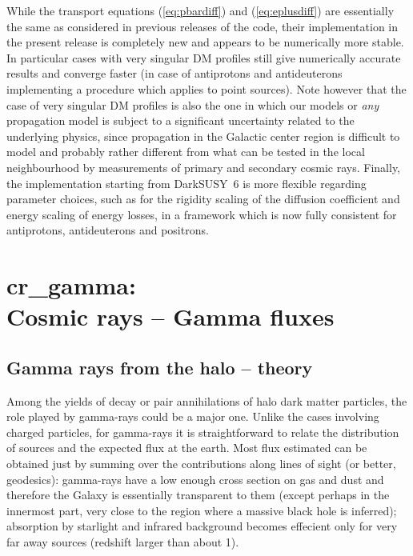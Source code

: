 \documentclass[a4paper,10pt,oneside]{book}
\newcommand{\codeb}[1]{\ftb{#1}}
\newcommand{\ds}{{\sffamily DarkSUSY}}
\newcommand{\ftb}[1]{{\bfseries \sffamily #1}}
\begin{document}
While the transport equations (\ref{eq:pbardiff}) and (\ref{eq:eplusdiff}) are essentially the same as considered
in previous releases of the code, their implementation in the present release is completely new and appears to be
numerically more stable. In particular cases with very singular DM profiles still give numerically accurate
results and converge faster
(in case of antiprotons and antideuterons implementing a procedure which applies to point sources).
Note however that the case of very singular DM profiles is also the one in which
 our models or 
{\it any} propagation model is subject to a significant uncertainty related to the underlying
physics,
since propagation in the
Galactic center region is difficult to model and probably rather different from what can be tested in the
local neighbourhood by measurements of primary and secondary cosmic rays. Finally, the 
implementation starting from \ds\ 6 is more flexible regarding parameter choices, such as for the 
rigidity scaling of the diffusion
coefficient and energy scaling of energy losses, in a framework which is now fully consistent for
antiprotons, antideuterons and positrons.

\chapter[cr\_gamma: Cosmic rays -- Gamma fluxes]{\codeb{cr\_gamma}:\\ Cosmic rays -- Gamma fluxes}
\label{ch:src/cr_gamma}


\section{Gamma rays from the halo -- theory}
\label{sec:cr_gamma}

Among the yields of decay or pair annihilations of halo dark matter particles,
the role played by gamma-rays could be a major one. Unlike the cases
involving charged particles, for gamma-rays it is straightforward
to relate the distribution of sources and the expected flux
at the earth. Most flux estimated can be obtained just by summing
over the contributions along 
lines of sight (or better, geodesics): gamma-rays have a low 
enough cross section on gas and dust and therefore the Galaxy is 
essentially transparent to them (except perhaps in the innermost part, 
very close to the region where a massive black hole is inferred); 
absorption by starlight and infrared background becomes effecient
only for very far away sources (redshift larger than about 1).
\end{document}
